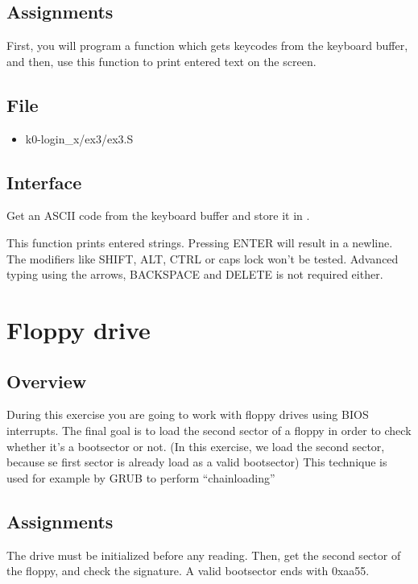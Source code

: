 \subsection*{Assignments}
First, you will program a function which gets keycodes from the keyboard
buffer, and then, use this function to print entered text on the screen.

\subsection*{File}
\begin{itemize}
  \item k0-login\_x/ex3/ex3.S
\end{itemize}

\subsection*{Interface}
{
  Get an ASCII code from the keyboard buffer and store it in .
}

{
  This function prints entered strings. Pressing ENTER will result in a
  newline.
  The modifiers like SHIFT, ALT, CTRL or caps lock won't be tested. Advanced
  typing using the arrows, BACKSPACE and DELETE is not required either.
}

%
%

\newpage

\section{Floppy drive}

\subsection*{Overview}
During this exercise you are going to work with floppy drives using BIOS
interrupts. The final goal is to load the second sector of a floppy in order
to check whether it's a bootsector or not. (In this exercise, we load the
second sector, because se first sector is already load as a valid bootsector)
This technique is used for example by GRUB to perform ``chainloading''

\subsection*{Assignments}
The drive must be initialized before any reading. Then, get the second sector of
the floppy, and check the signature. A valid bootsector ends with 0xaa55.

